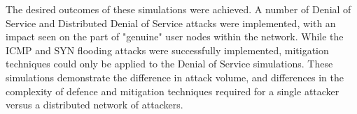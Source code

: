 The desired outcomes of these simulations were achieved. A number of Denial of
Service and Distributed Denial of Service attacks were implemented, with an
impact seen on the part of "genuine" user nodes within the network. While the
ICMP and SYN flooding attacks were successfully implemented, mitigation
techniques could only be applied to the Denial of Service simulations. These
simulations demonstrate the difference in attack volume, and differences in the
complexity of defence and mitigation techniques required for a single attacker
versus a distributed network of attackers.
